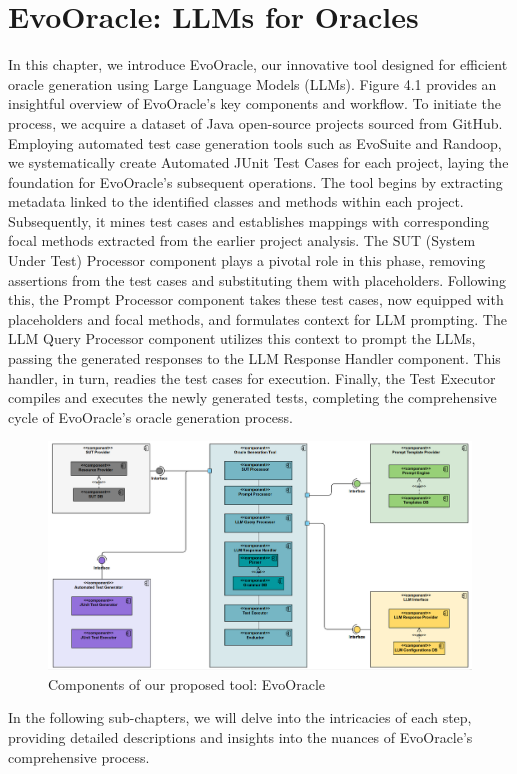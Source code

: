 \chapter{EvoOracle: LLMs for Oracles}
\label{cha:evoOracles}
\vspace{0.4 cm}

In this chapter, we introduce EvoOracle, our innovative tool designed for efficient oracle generation using Large Language Models (LLMs). Figure 4.1 provides an insightful overview of EvoOracle's key components and workflow. To initiate the process, we acquire a dataset of Java open-source projects sourced from GitHub. Employing automated test case generation tools such as EvoSuite and Randoop, we systematically create Automated JUnit Test Cases for each project, laying the foundation for EvoOracle's subsequent operations. The tool begins by extracting metadata linked to the identified classes and methods within each project. Subsequently, it mines test cases and establishes mappings with corresponding focal methods extracted from the earlier project analysis. The SUT (System Under Test) Processor component plays a pivotal role in this phase, removing assertions from the test cases and substituting them with placeholders. Following this, the Prompt Processor component takes these test cases, now equipped with placeholders and focal methods, and formulates context for LLM prompting. The LLM Query Processor component utilizes this context to prompt the LLMs, passing the generated responses to the LLM Response Handler component. This handler, in turn, readies the test cases for execution. Finally, the Test Executor compiles and executes the newly generated tests, completing the comprehensive cycle of EvoOracle's oracle generation process.

\begin{figure}[H]
\centering
\includegraphics[width=1\textwidth]{images/UML_Component_Diagram_EvoOracle_v2.png}
\caption{Components of our proposed tool: EvoOracle}
\label{fig:component_diagram}
\end{figure}

In the following sub-chapters, we will delve into the intricacies of each step, providing detailed descriptions and insights into the nuances of EvoOracle's comprehensive process.

